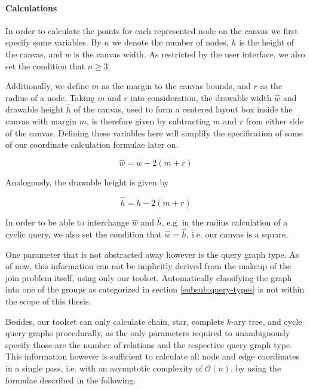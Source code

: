 \paragraph{Calculations}
In order to calculate the points for each represented node on the canvas we first specify some variables.
By $n$ we denote the number of nodes, $h$ is the height of the canvas, and $w$ is the canvas width. 
As restricted by the user interface, we also set the condition that $n \geq 3$.

Additionally, we define $m$ as the margin to the canvas bounds, and $r$ as the radius of a node.
Taking $m$ and $r$ into consideration, the drawable width $\hat{w}$ and drawable height $\hat{h}$ of the canvas, used to form a centered layout box inside the canvas with margin $m$, is therefore given by subtracting $m$ and $r$ from either side of the canvas. Defining these variables here will simplify the specification of some of our coordinate calculation formulae later on.

\begin{equation}\label{eqn:painting-w_hat}
    \hat{w} = w - 2(m + r)
\end{equation}

Analogously, the drawable height is given by

\begin{equation}\label{eqn:painting-h_hat}
    \hat{h} = h - 2(m + r)    
\end{equation}

In order to be able to interchange $\hat{w}$ and $\hat{h}$, e.g. in the radius calculation of a cyclic query, we also set the condition that $\hat{w} = \hat{h}$, i.e. our canvas is a square.

One parameter that is not abstracted away however is the query graph type. As of now, this information can not be implicitly derived from the makeup of the join problem itself, using only our toolset. Automatically classifying the graph into one of the groups as categorized in section \ref{subsub:query-types} is not within the scope of this thesis.

Besides, our toolset can only calculate chain, star, complete $k$-ary tree, and cycle query graphs procedurally, as the only parameters required to unambiguously specify those are the number of relations and the respective query graph type. This information however is sufficient to calculate all node and edge coordinates in a single pass, i.e. with an asymptotic complexity of $\mathcal{O}(n)$, by using the formulae described in the following.\\

